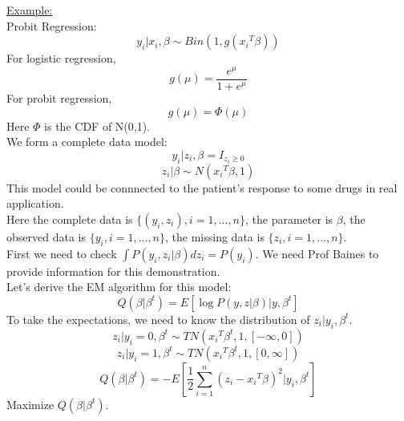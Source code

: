 \documentclass[a4paper]{article}
\begin{document}
\underline{Example: } \\
Probit Regression:
\begin{equation} 
y_{i} \vert x_i, \beta \sim Bin(1, g({x_{i}}^T\beta))
\end{equation}
For logistic regression, \\
\begin{equation} 
g(\mu) = \frac{e^{\mu}}{1 + e^{\mu}}
\end{equation}
For probit regression,\\
\begin{equation} 
g(\mu) = \Phi (\mu) 
\end{equation}
 Here $\Phi$  is the CDF of N(0,1).\\
 We form a complete data model: 
 \begin{equation} 
 y_i \vert z_i, \beta  = I_{ z_i \ge 0 }
\end{equation} 
 \begin{equation} 
z_i \vert \beta \sim N({x_i}^T\beta, 1)
\end{equation} 
This model could be connnected to the patient's response to some drugs in real application. \\
Here the complete data is $\{(y_i, z_i), i= 1, ..., n\}$, the parameter is $\beta$, the observed data is
$\{y_i, i= 1, ..., n\}$, the missing data is $\{ z_i, i= 1, ..., n\}$. \\
First we need to check $\int P(y_i, z_i\vert \beta) dz_i = P(y_i)$. We need Prof Baines to provide information for this demonstration. \\
Let's derive the EM algorithm for this model:\\
 \begin{equation} 
Q(\beta \vert \beta^{t}) = E\left[\log P(y, z\vert \beta)\vert y, \beta^t\right]
\end{equation} 
To take the expectations, we need to know the distribution of $z_i | y_i, \beta^t$.
  \begin{equation} 
  z_i \vert y_i = 0, \beta^{t} \sim TN({x_i}^T\beta^{t}, 1, [-\infty, 0])
\end{equation} 
  \begin{equation} 
  z_i \vert y_i = 1, \beta^{t} \sim  TN({x_i}^T\beta^{t}, 1, [0, \infty ])
\end{equation} 
  \begin{equation} 
Q(\beta \vert \beta^t) = -E\left[\frac{1}{2}\sum_{i=1}^{n}(z_i - {x_i}^T\beta)^2\vert y_i, \beta^t\right]
\end{equation} 
Maximize $Q(\beta \vert \beta^t)$. \\
\end{document}
